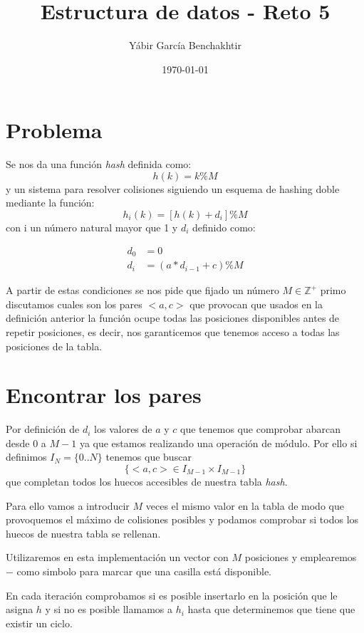 \documentclass{article}
\begin{document}
\title{Estructura de datos - Reto 5}
\author{Yábir García Benchakhtir}
\date{\today}
\maketitle


\section{Problema}

Se nos da una función \textit{hash} definida como: $$ h(k) = k \% M $$
y un sistema para resolver colisiones siguiendo un esquema de hashing doble mediante la función:
$$ h_i(k) = [h(k) + d_i] \% M $$ con i un número natural mayor que 1 y $d_i$ definido como:

\begin{align*}
  d_0 &= 0 \\
  d_i &= (a*d_{i-1}+c) \% M
\end{align*}

A partir de estas condiciones se nos pide que fijado un número $M \in \mathbb{Z}^+$
primo discutamos cuales son los pares $<a,c>$ que provocan que usados
en la definición anterior la función ocupe todas las posiciones
disponibles antes de repetir posiciones, es decir, nos garanticemos
que tenemos acceso a todas las posiciones de la tabla.

\section{Encontrar los pares}

Por definición de $d_i$ los valores de $a$ y $c$ que tenemos que
comprobar abarcan desde 0 a $M-1$ ya que estamos realizando una
operación de módulo. Por ello si definimos $I_N = \{0 .. N\}$ tenemos que buscar
$$\{<a,c> \in I_{M-1}\times I_{M-1}\}$$ que completan todos los huecos accesibles de nuestra
tabla \textit{hash}.

Para ello vamos a introducir $M$ veces el mismo valor en la tabla de
modo que provoquemos el máximo de colisiones posibles y podamos
comprobar si todos los huecos de nuestra tabla se rellenan.

Utilizaremos en esta implementación un vector con $M$ posiciones y
emplearemos $-$ como simbolo para marcar que una casilla está disponible.

En cada iteración comprobamos si es posible insertarlo en la posición
que le asigna $h$ y si no es posible llamamos a $h_i$ hasta que
determinemos que tiene que existir un ciclo.
\end{document}
